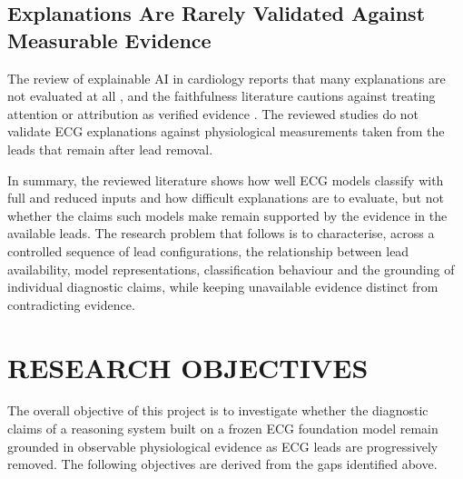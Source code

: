\subsection*{Explanations Are Rarely Validated Against Measurable Evidence}
The review of explainable AI in cardiology reports that many explanations are not evaluated at all \cite{SALIH2024XAICARDIO}, and the faithfulness literature cautions against treating attention or attribution as verified evidence \cite{JAIN2019ATTENTION,HOOKER2019ROAR}. The reviewed studies do not validate ECG explanations against physiological measurements taken from the leads that remain after lead removal.

In summary, the reviewed literature shows how well ECG models classify with full and reduced inputs and how difficult explanations are to evaluate, but not whether the claims such models make remain supported by the evidence in the available leads. The research problem that follows is to characterise, across a controlled sequence of lead configurations, the relationship between lead availability, model representations, classification behaviour and the grounding of individual diagnostic claims, while keeping unavailable evidence distinct from contradicting evidence.

\section{RESEARCH OBJECTIVES}
The overall objective of this project is to investigate whether the diagnostic claims of a reasoning system built on a frozen ECG foundation model remain grounded in observable physiological evidence as ECG leads are progressively removed. The following objectives are derived from the gaps identified above.

